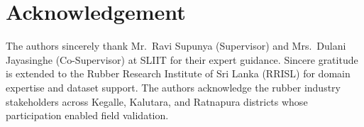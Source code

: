 \documentclass[10pt, conference]{IEEEtran}
\begin{document}
\section*{Acknowledgement}

The authors sincerely thank Mr.\ Ravi Supunya (Supervisor) and
Mrs.\ Dulani Jayasinghe (Co-Supervisor) at SLIIT for their expert
guidance. Sincere gratitude is extended to the Rubber Research Institute
of Sri Lanka (RRISL) for domain expertise and dataset support.
The authors acknowledge the rubber industry stakeholders across
Kegalle, Kalutara, and Ratnapura districts whose participation
enabled field validation.


\end{document}
